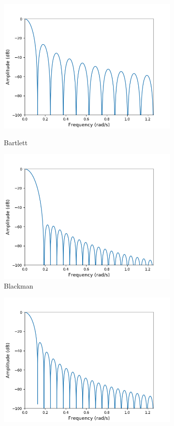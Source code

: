 \begin{figure}
\centering
\begin{subfigure}{0.49\textwidth}
\centering
\includegraphics[width=\textwidth]{figures/dbplots/bartlett.png}
\caption{Bartlett}
\label{fig:bartlett_db}
\includegraphics[width=\textwidth]{figures/dbplots/blackman.png}
\caption{Blackman}
\label{fig:blackman_db}
\end{subfigure}
\begin{subfigure}{0.49\textwidth}
\centering
\includegraphics[width=\textwidth]{figures/dbplots/hann.png}

\end{subfigure}
\end{figure}

